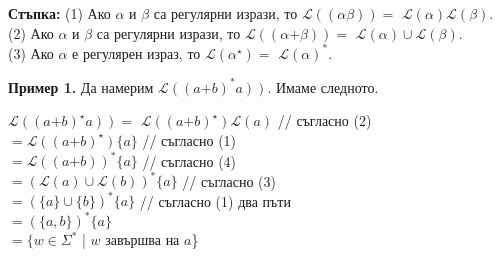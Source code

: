 \documentclass[openany]{book}
\newcommand{\bleft}{
    \boldsymbol{\left(\right.}
}
\newcommand{\bright}{
    \boldsymbol{\left.\right)}
}
\newcommand{\bplus}{
    \boldsymbol{+}
}
\begin{document}
            \vspace{5pt}
            
            \textbf{Стъпка:} (1) Ако $\alpha$ и $\beta$ са регулярни изрази, то $\mathscr{L}(\bleft \alpha \beta \bright) =$
            $\mathscr{L}(\alpha)\mathscr{L}(\beta)$. \\
            (2) Ако $\alpha$ и $\beta$ са регулярни изрази, то $\mathscr{L}(\bleft \alpha \bplus \beta \bright) =$
            $\mathscr{L}(\alpha) \cup \mathscr{L}(\beta)$. \\
            (3) Ако $\alpha$ е регулярен израз, то $\mathscr{L}(\alpha^\star) =$
            $\mathscr{L}(\alpha)^*$. 
        
            \vspace{15pt}
            
            \textbf{Пример 1.} Да намерим $\mathscr{L}(\bleft a \bplus b \bright ^* a \bright)$. Имаме следното. \\
            \begin{center}
                $\mathscr{L}(\bleft a \bplus b \bright ^\star a \bright) = $
                $\mathscr{L}(\bleft a \bplus b \bright ^\star) \mathscr{L}(a)$ \hspace{10pt} // съгласно (2) \\
                \hspace{62pt}$=\mathscr{L}(\bleft a \bplus b \bright ^\star)\{a\}$ \hspace{10pt} // съгласно (1) \\
                \hspace{62pt}$=\mathscr{L}(\bleft a \bplus b \bright )^*\{a\}$ \hspace{10pt} // съгласно (4) \\
                \hspace{76pt}$=(\mathscr{L}(a) \cup \mathscr{L}(b))^*\{a\}$ \hspace{10pt} // съгласно (3) \\
                \hspace{104pt}$=(\{a\} \cup \{b\})^*\{a\}$ \hspace{10pt} // съгласно (1) два пъти \\
                \hspace{-44pt}$=(\{a,b\})^*\{a\}$ \\
                \hspace{33pt}$=\{w \in \Sigma^*$ | $w$ завършва на $a$\}
            \end{center}
        
\end{document}
